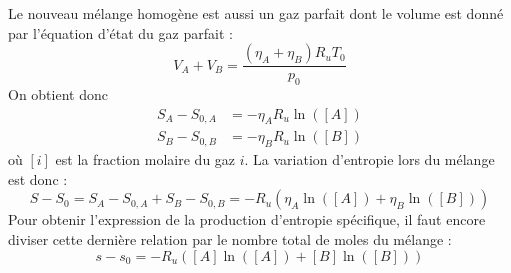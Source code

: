 Le nouveau mélange homogène est aussi un gaz parfait dont le volume est donné par l'équation d'état du gaz parfait :
\begin{equation} V_A + V_B = \frac{(\eta_A+\eta_B)R_uT_0}{p_0} \end{equation}
On obtient donc 
\begin{align} S_A - S_{0,A} &= -\eta_AR_u\ln\left(\left[A\right]\right) \\ S_B - S_{0,B} &= -\eta_BR_u\ln\left(\left[B\right]\right)\end{align}
où $\left[i\right]$ est la fraction molaire du gaz $i$. La variation d'entropie lors du mélange est donc :
\begin{equation} S-S_0 = S_A - S_{0,A} + S_B - S_{0,B} = -R_u\left(\eta_A\ln\left(\left[A\right]\right) + \eta_B\ln\left(\left[B\right]\right)\right) \end{equation}
Pour obtenir l'expression de la production d'entropie spécifique, il faut encore diviser cette dernière relation par le nombre total de moles du mélange :
\begin{equation} s-s_0 =  -R_u\left(\left[A\right]\ln\left(\left[A\right]\right) + \left[B\right]\ln\left(\left[B\right]\right)\right) \end{equation}

